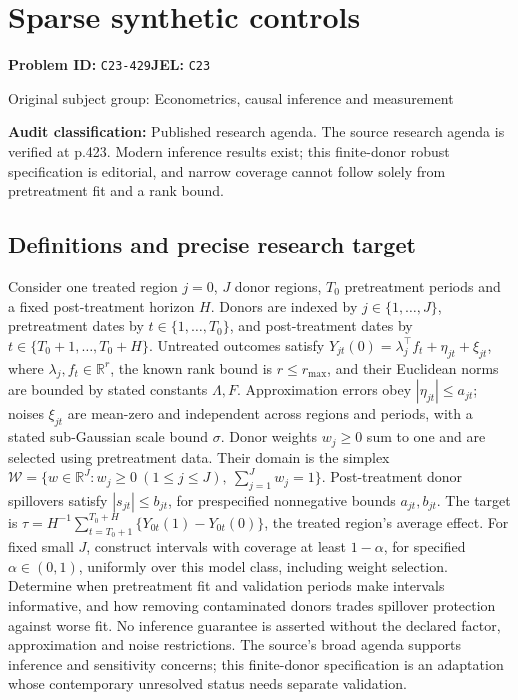 \documentclass[11pt,a4paper]{article}
\begin{document}
\section*{Sparse synthetic controls}
\textbf{Problem ID:} \texttt{C23-429}\quad \textbf{JEL:} \texttt{C23}\par
\label{problem:OP-0425}
{\sffamily\small\color{muted}Original subject group: Econometrics, causal inference and measurement\par}
\label{definitions:problem:30007707}
\textbf{Audit classification:} Published research agenda. The source research agenda is verified at p.423. Modern inference results exist; this finite-donor robust specification is editorial, and narrow coverage cannot follow solely from pretreatment fit and a rank bound.
\subsection*{Definitions and precise research target}
Consider one treated region \(j=0\), \(J\) donor regions, \(T_0\) pretreatment periods and a fixed post-treatment horizon \(H\). Donors are indexed by \(j\in\{1,\ldots,J\}\), pretreatment dates by \(t\in\{1,\ldots,T_0\}\), and post-treatment dates by \(t\in\{T_0+1,\ldots,T_0+H\}\). Untreated outcomes satisfy \(Y_{jt}(0)=\lambda_j^\top f_t+\eta_{jt}+\xi_{jt}\), where \(\lambda_j,f_t\in\mathbb R^r\), the known rank bound is \(r\leq r_{\max}\), and their Euclidean norms are bounded by stated constants \(\Lambda,F\). Approximation errors obey \(|\eta_{jt}|\leq a_{jt}\); noises \(\xi_{jt}\) are mean-zero and independent across regions and periods, with a stated sub-Gaussian scale bound \(\sigma\). Donor weights \(w_j\geq0\) sum to one and are selected using pretreatment data. Their domain is the simplex \(\mathcal W=\{w\in\mathbb R^J:w_j\geq0\ (1\leq j\leq J),\ \sum_{j=1}^Jw_j=1\}\). Post-treatment donor spillovers satisfy \(|s_{jt}|\leq b_{jt}\), for prespecified nonnegative bounds \(a_{jt},b_{jt}\). The target is \(\tau=H^{-1}\sum_{t=T_0+1}^{T_0+H}\{Y_{0t}(1)-Y_{0t}(0)\}\), the treated region's average effect. For fixed small \(J\), construct intervals with coverage at least \(1-\alpha\), for specified \(\alpha\in(0,1)\), uniformly over this model class, including weight selection. Determine when pretreatment fit and validation periods make intervals informative, and how removing contaminated donors trades spillover protection against worse fit. No inference guarantee is asserted without the declared factor, approximation and noise restrictions. The source's broad agenda supports inference and sensitivity concerns; this finite-donor specification is an adaptation whose contemporary unresolved status needs separate validation.
\end{document}
